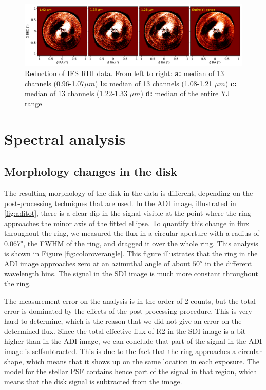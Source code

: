 \documentclass[twoside,single,12pt]{lion-msc}
\begin{document}
\begin{figure}[htb]
\centering
\includegraphics[trim={0cm 0cm 0cm 0cm},clip,width = \textwidth]{RDI_color_imcon}
\caption{Reduction of IFS RDI data. From left to right: \textbf{a:} median of 13 channels (0.96-1.07$\mu m$) \textbf{b:} median of 13 channels (1.08-1.21 $\mu m$) \textbf{c:} median of 13 channels (1.22-1.33 $\mu m$) \textbf{d:} median of the entire YJ range}
\label{fig:RDIcolor}
\end{figure}

\chapter{Spectral analysis}
\section{Morphology changes in the disk}

The resulting morphology of the disk in the data is different, depending on the post-processing techniques that are used. In the ADI image, illustrated in \ref{fig:aditot}, there is a clear dip in the signal visible at the point where the ring approaches the minor axis of the fitted ellipse. To quantify this change in flux throughout the ring, we measured the flux in a circular aperture with a radius of 0.067", the FWHM of the ring, and dragged it over the whole ring. This analysis is shown in Figure \ref{fig:coloroverangle}. This figure illustrates that the ring in the ADI image approaches zero at an azimuthal angle of about $50^o$ in the different wavelength bins. The signal in the SDI image is much more constant throughout the ring. 
\bigskip

The measurement error on the analysis is in the order of 2 counts, but the total error is dominated by the effects of the post-processing procedure. This is very hard to determine, which is the reason that we did not give an error on the determined flux. Since the total effective flux of R2 in the SDI image is a bit higher than in the ADI image, we can conclude that part of the signal in the ADI image is selfsubtracted. This is due to the fact that the ring approaches a circular shape, which means that it shows up on the same location in each exposure. The model for the stellar PSF contains hence part of the signal in that region, which means that the disk signal is subtracted from the image. 
\bigskip
\end{document}
